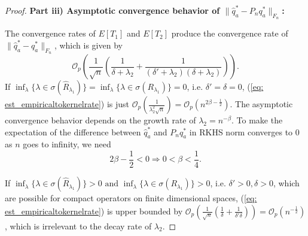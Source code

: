 \begin{proof}
    \textbf{Part iii) Asymptotic convergence behavior of $\|\widehat{q}_a^*-P_nq_a^*\|_{F_n}$:}

    The convergence rates of $E[T_1]$ and $E[T_2]$ produce the convergence rate of $\|\widehat{q}_a^*-q_a^*\|_{F_n}$, 
    which is given by 
    \begin{equation}
        \label{eq: est_empiricaltokernelrate}
        \mathcal{O}_p(\frac{1}{\sqrt{n}}(\frac{1}{\delta+\lambda_2}+\frac{1}{(\delta'+\lambda_2)(\delta+\lambda_2)})). 
    \end{equation}
    If $\inf_{\lambda}\{\lambda\in\sigma(\widehat{R}_{\lambda_1})\} = \inf_{\lambda}\{\lambda\in\sigma(R_{\lambda_1})\} = 0$, i.e. $\delta'=\delta=0$, 
    (\ref{eq: est_empiricaltokernelrate}) is just $\mathcal{O}_p(\frac{1}{\lambda^2_2\sqrt{n}}) = \mathcal{O}_p(n^{2\beta-\frac{1}{2}})$.
    The asymptotic convergence behavior depends on the growth rate of $\lambda_2=n^{-\beta}$. 
    To make the expectation of the difference between $\widehat{q}_a^*$ and $P_nq_a^*$ in RKHS norm converges to 0 as $n$ goes to infinity, 
    we need 
    \begin{equation*}
        2\beta-\frac{1}{2}<0 \Longrightarrow 0<\beta<\frac{1}{4}.
    \end{equation*}

    If $\inf_{\lambda}\{\lambda\in\sigma(\widehat{R}_{\lambda_1})\}>0 \text{ and } \inf_{\lambda}\{\lambda\in\sigma(R_{\lambda_1})\} > 0$, i.e. $\delta'>0, \delta>0$, 
    which are possible for compact operators on finite dimensional spaces, 
    (\ref{eq: est_empiricaltokernelrate}) is upper bounded by $\mathcal{O}_p(\frac{1}{\sqrt{n}}(\frac{1}{\delta}+\frac{1}{\delta'\delta}))=\mathcal{O}_p(n^{-\frac{1}{2}})$, 
    which is irrelevant to the decay rate of $\lambda_2$.
\end{proof}

